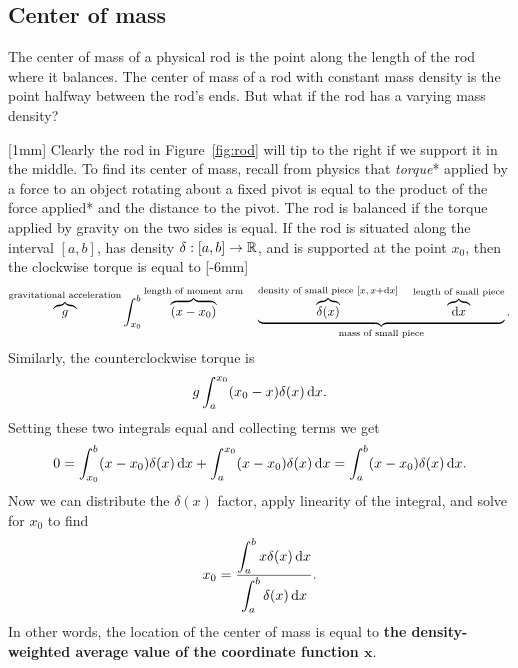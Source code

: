 \documentclass[prettycode,shellescape]{watsonbook}
\begin{document}
\subsection{Center of mass}

The center of mass of a physical rod is the point along the length of
the rod where it balances. The center of mass of a rod with constant
mass density is the point halfway between the rod's ends. But what if
the rod has a varying mass density?

\begin{center}
\end{center}

[1mm] Clearly the rod in Figure~\ref{fig:rod} will tip to
the right if we support it in the middle. To find its center of mass,
recall from physics that \textit{torque}* applied by a force to an
object rotating about a fixed pivot is equal to the product of the
force applied* and the distance to the pivot. The rod is balanced if
the torque applied by gravity on the two sides is equal. If the rod is
situated along the interval $[a,b]$, has density
$\delta:[a,b] \to \mathbb{R}$, and is supported at the point $x_0$, then the
clockwise torque is equal to [-6mm]
\[
  \overbrace{g}^{\text{gravitational acceleration}}\int_{x_0}^b
  \overbrace{(x-x_0)}^{\text{length of moment arm}} \quad
  \underbrace{\overbrace{\delta(x)}^{\text{density of small piece
      }[x,\, x+\mathrm{d} x]} \quad \overbrace{\mathrm{d} x}^{\text{length of small
        piece}}}_{\text{mass of small piece}}.
\]
Similarly, the counterclockwise torque is 
\[
  g\int_{a}^{x_0} (x_0-x)\delta(x) \, \mathrm{d} x. 
\]
Setting these two integrals equal and collecting terms we get 
\[
  0 = \int_{x_0}^{b} (x-x_0)\delta(x) \, \mathrm{d} x + \int_{a}^{x_0} (x-x_0)\delta(x) \, \mathrm{d} x =
  \int_{a}^{b} (x-x_0)\delta(x) \, \mathrm{d} x. 
\]
Now we can distribute the $\delta(x)$ factor, apply linearity of the
integral, and solve for $x_0$ to find
\[
  x_0 = \frac{\displaystyle{\int_a^b x \delta(x) \, \mathrm{d}x}}{\displaystyle{\int_a^b \delta(x) \, \mathrm{d}x}}. 
\]
In other words, the location of the center of mass is equal to
\textbf{the density-weighted average value of the coordinate function
  $\mathbf{x}$}.
\end{document}
